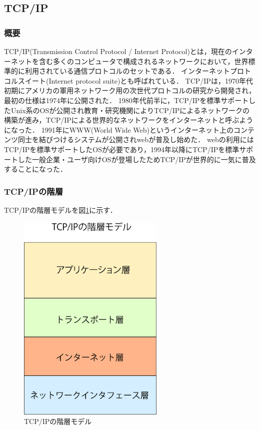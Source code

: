 \documentclass[12pt,a4j,titlepage]{ltjsarticle}
\begin{document}
\subsection{TCP/IP}
\subsubsection{概要}
TCP/IP(Transmission Control Protocol / Internet Protocol)とは，現在のインターネットを含む多くのコンピュータで構成されるネットワークにおいて，世界標準的に利用されている通信プロトコルのセットである．
インターネットプロトコルスイート(Internet protocol suite)とも呼ばれている．
TCP/IPは，1970年代初期にアメリカの軍用ネットワーク用の次世代プロトコルの研究から開発され，最初の仕様は1974年に公開された．
1980年代前半に，TCP/IPを標準サポートしたUnix系のOSが公開され教育・研究機関によりTCP/IPによるネットワークの構築が進み，TCP/IPによる世界的なネットワークをインターネットと呼ぶようになった．
1991年にWWW(World Wide Web)というインターネット上のコンテンツ同士を結びつけるシステムが公開されwebが普及し始めた．
webの利用にはTCP/IPを標準サポートしたOSが必要であり，1994年以降にTCP/IPを標準サポートした一般企業・ユーザ向けOSが登場したためTCP/IPが世界的に一気に普及することになった．
\subsubsection{TCP/IPの階層}
TCP/IPの階層モデルを図\ref{fig:tcpip_sou}に示す．

\begin{figure}[h]
\centering
\includegraphics[clip,width=70mm]{figures/TCPIPmodel.pdf}
\caption[TCP/IPの階層モデル]{TCP/IPの階層モデル\linebreak}
\label{fig:tcpip_sou}
\end{figure}
\end{document}

